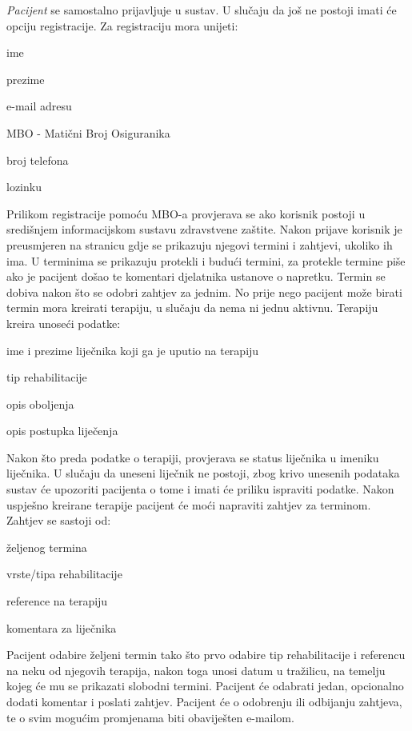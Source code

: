 		\textit{Pacijent} se samostalno prijavljuje u sustav. U slučaju da još ne postoji imati će opciju registracije. Za registraciju mora unijeti: 
		\begin{packed_item}
			\item ime
			\item prezime
			\item e-mail adresu
			\item MBO - Matični Broj Osiguranika
			\item broj telefona
			\item lozinku
		\end{packed_item}
		Prilikom registracije pomoću MBO-a provjerava se ako korisnik postoji u središnjem informacijskom sustavu zdravstvene zaštite.
		Nakon prijave korisnik je preusmjeren na stranicu gdje se prikazuju njegovi termini i zahtjevi, ukoliko ih ima. U terminima se prikazuju protekli i budući termini, za protekle termine piše ako je pacijent došao te komentari djelatnika ustanove o napretku. Termin se dobiva nakon što se odobri zahtjev za jednim. No prije nego pacijent može birati termin mora kreirati terapiju, u slučaju da nema ni jednu aktivnu. Terapiju kreira unoseći podatke:
		\begin{packed_item}
			\item ime i prezime liječnika koji ga je uputio na terapiju
			\item tip rehabilitacije
			\item opis oboljenja 
			\item opis postupka liječenja
		\end{packed_item}
		Nakon što preda podatke o terapiji, provjerava se status liječnika u imeniku liječnika. U slučaju da uneseni liječnik ne postoji, zbog krivo unesenih podataka sustav će upozoriti pacijenta o tome i imati će priliku ispraviti podatke. Nakon uspješno kreirane terapije pacijent će moći napraviti zahtjev za terminom. 
		Zahtjev se sastoji od:
		\begin{packed_item}
			\item željenog termina
			\item vrste/tipa rehabilitacije
			\item reference na terapiju
			\item komentara za liječnika
		\end{packed_item}
		Pacijent odabire željeni termin tako što prvo odabire tip rehabilitacije i referencu na neku od njegovih terapija, nakon toga unosi datum u tražilicu, na temelju kojeg će mu se prikazati slobodni termini. Pacijent će odabrati jedan, opcionalno dodati komentar i poslati zahtjev. Pacijent će o odobrenju ili odbijanju zahtjeva, te o svim mogućim promjenama biti obaviješten e-mailom.
		
